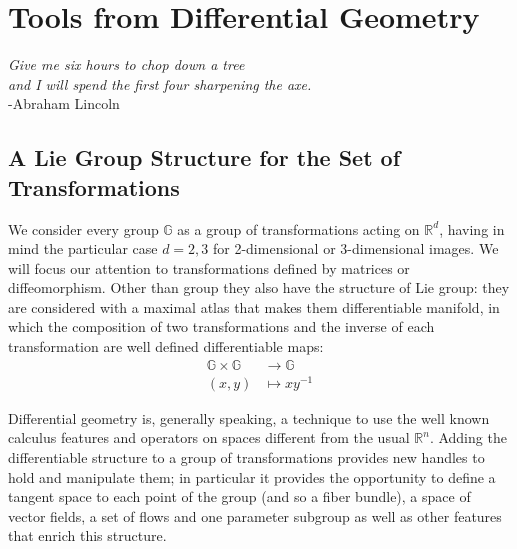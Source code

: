 \chapter{Tools from Differential Geometry}\label{ch:tools}

\begin{flushright}
\emph{Give me six hours to chop down a tree\\ and I will spend the first four sharpening the axe.}
\\ -Abraham Lincoln
\end{flushright}

\vspace{0.6cm}

\section{A Lie Group Structure for the Set of Transformations}\label{se:finite_lie_group}

We consider every group $\mathbb{G}$ as a group of transformations acting on $\mathbb{R}^{d}$, having in mind the particular case $d=2,3$ for 2-dimensional or 3-dimensional images.
We will focus our attention to transformations defined by matrices or diffeomorphism. Other than group they also have the structure of Lie group: they are considered with a maximal atlas that makes them differentiable manifold, in which the composition of two transformations and the inverse of each transformation are well defined differentiable maps:
\begin{align*}
\mathbb{G} \times \mathbb{G} & \longrightarrow  \mathbb{G}    \\
(x,y) &\longmapsto  x y^{-1}
\end{align*}

Differential geometry is, generally speaking, a technique to use the well known calculus features and operators on spaces different from the usual $\mathbb{R}^{n}$. Adding the differentiable structure to a group of transformations provides new handles to hold and manipulate them; in particular it provides the opportunity to define a tangent space to each point of the group (and so a fiber bundle), a space of vector fields, a set of flows and one parameter subgroup as well as other features that enrich this structure.

